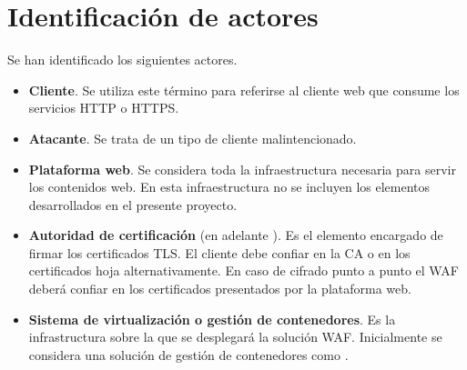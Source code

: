 \section{Identificación de actores}
\par Se han identificado los siguientes actores.
\begin{itemize}
  \item {\bf Cliente}. Se utiliza este término para referirse al cliente web que consume los servicios HTTP o HTTPS.
  \item {\bf \Gls{Atacante}}. Se trata de un tipo de cliente malintencionado.
  \item {\bf Plataforma web}. Se considera toda la infraestructura necesaria para servir los contenidos web. En esta infraestructura no se incluyen los elementos desarrollados en el presente proyecto.
  \item {\bf Autoridad de certificación} (en adelante ). Es el elemento encargado de firmar los certificados TLS. El cliente debe confiar en la CA o en los certificados hoja alternativamente. En caso de cifrado punto a punto el WAF deberá confiar en los certificados presentados por la plataforma web.
  \item {\bf Sistema de virtualización o gestión de contenedores}. Es la infrastructura sobre la que se desplegará la solución WAF. Inicialmente se
    considera una solución de gestión de contenedores como \cite{docker}.
\end{itemize}

\clearpage
